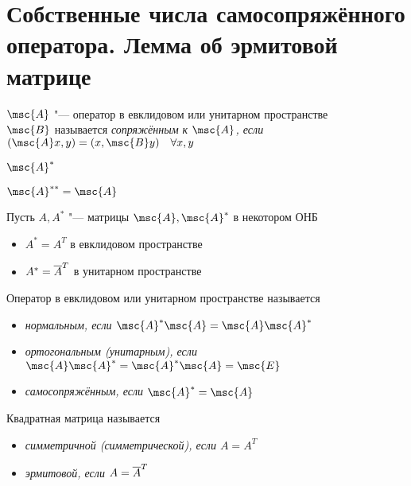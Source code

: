 \section{Собственные числа самосопряжённого оператора. Лемма об эрмитовой матрице}

\begin{definition}
	$ \msc{A} $ "--- оператор в евклидовом или унитарном пространстве \\
	$ \msc{B} $ называется \it{сопряжённым} к $ \msc{A} $, если $ (\msc{A}x, y) = (x, \msc{B}y) \quad \forall x, y $
\end{definition}

\begin{notation}
	$ \msc{A}^* $
\end{notation}

\begin{props}
	\item $ \msc{A}^{**} = \msc{A} $
	\item Пусть $ A, A^* $ "--- матрицы $ \msc{A}, \msc{A}^* $ в некотором ОНБ

	\begin{itemize}
		\item $ A^* = A^T $ в евклидовом пространстве
		\item $ A^* = \overline{A}^T $ в унитарном пространстве
	\end{itemize}
\end{props}

\begin{definition}
	Оператор в евклидовом или унитарном пространстве называется
	\begin{itemize}
		\item \it{нормальным}, если $ \msc{A}^*\msc{A} = \msc{A}\msc{A}^* $
		\item \it{ортогональным} (\it{унитарным}), если $ \msc{A}\msc{A}^* = \msc{A}^*\msc{A} = \msc{E} $
		\item \it{самосопряжённым}, если $ \msc{A}^* = \msc{A} $
	\end{itemize}
\end{definition}

\begin{definition}
	Квадратная матрица называется
	\begin{itemize}
		\item \it{симметричной} (\it{симметрической}), если $ A = A^T $
		\item \it{эрмитовой}, если $ A = \overline{A}^T $
	\end{itemize}
\end{definition}

